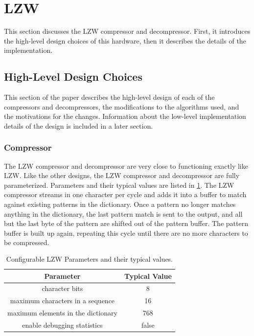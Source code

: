 \documentclass[doublespace,nopageskip]{VTthesis}
\begin{document}
\section{LZW}\label{se:lzw}
This section discusses the LZW compressor and decompressor. First, it introduces the high-level design choices of this hardware, then it describes the details of the implementation.

\subsection{High-Level Design Choices}\label{se:high-level_design_choices}
This section of the paper describes the high-level design of each of the compressors and decompressors, the modifications to the algorithms used, and the motivations for the changes. Information about the low-level implementation details of the design is included in a later section.

\subsubsection{Compressor}\label{sss:lzw_compressor_design}
The LZW compressor and decompressor are very close to functioning exactly like LZW. Like the other designs, the LZW compressor and decompressor are fully parameterized. Parameters and their typical values are listed in \ref{tab:lzw-configuration-table}. The LZW compressor streams in one character per cycle and adds it into a buffer to match against existing patterns in the dictionary. Once a pattern no longer matches anything in the dictionary, the last pattern match is sent to the output, and all but the last byte of the pattern are shifted out of the pattern buffer. The pattern buffer is built up again, repeating this cycle until there are no more characters to be compressed.

\begin{table}[htb]
	\centering
	\caption{Configurable LZW Parameters and their typical values.}
	\begin{tabular}{cc}
	    \toprule
	    Parameter & Typical Value \\
	    \midrule
	    character bits & 8 \\
	    \midrule
	    maximum characters in a sequence & 16 \\
	    \midrule
	    maximum elements in the dictionary & 768 \\ 
	    \midrule
	    enable debugging statistics & false \\
	    \bottomrule
	\end{tabular}
	\label{tab:lzw-configuration-table}
\end{table}
\end{document}
